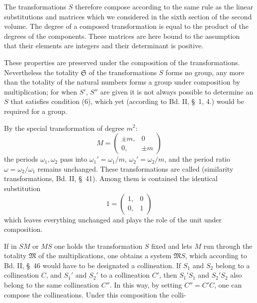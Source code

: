 
The transformations $S$ therefore compose according to the same rule as the linear substitutions and matrices which we considered in the sixth section of the second volume. The degree of a composed transformation is equal to the product of the degrees of the components. These matrices are here bound to the assumption that their elements are integers and their determinant is positive.

These properties are preserved under the composition of the transformations. Nevertheless the totality $\mathfrak{S}$ of the transformations $S$ forms no group, any more than the totality of the natural numbers forms a group under composition by multiplication; for when $S'$, $S''$ are given it is not always possible to determine an $S$ that satisfies condition (6), which yet (according to Bd. II, \S\ 1, 4.) would be required for a group.

By the special transformation of degree $m^2$:
\[
M = \begin{pmatrix} \pm m, & 0 \\ 0, & \pm m \end{pmatrix}
\]
the periods $\omega_1, \omega_2$ pass into $\omega_1' = \omega_1/m$, $\omega_2' = \omega_2/m$, and the period ratio $\omega = \omega_2/\omega_1$ remains unchanged. These transformations are called  (similarity transformations, Bd. II, \S\ 41). Among them is contained the identical substitution
\[
1 = \begin{pmatrix} 1, & 0 \\ 0, & 1 \end{pmatrix}
\]
which leaves everything unchanged and plays the role of the unit under composition.



If in $SM$ or $MS$ one holds the transformation $S$ fixed and lets $M$ run through the totality $\mathfrak{M}$ of the multiplications, one obtains a system $\mathfrak{M}S$, which according to Bd. II, \S\ 46 would have to be designated a collineation. If $S_1$ and $S_2$ belong to a collineation $C$, and $S_1'$ and $S_2'$ to a collineation $C'$, then $S_1'S_1$ and $S_2'S_2$ also belong to the same collineation $C''$. In this way, by setting $C'' = C'C$, one can compose the collineations. Under this composition the colli-
